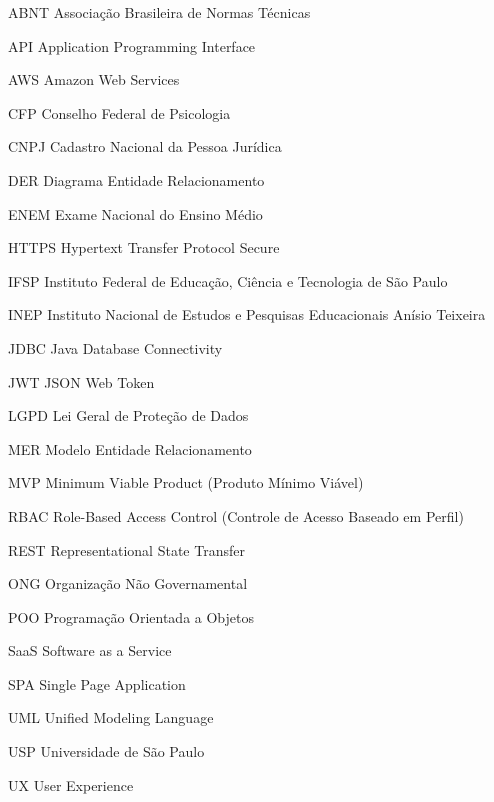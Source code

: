 \begin{siglas}
  \item[ABNT] Associação Brasileira de Normas Técnicas
  \item[API] Application Programming Interface
  \item[AWS] Amazon Web Services
  \item[CFP] Conselho Federal de Psicologia
  \item[CNPJ] Cadastro Nacional da Pessoa Jurídica
  \item[DER] Diagrama Entidade Relacionamento
  \item[ENEM] Exame Nacional do Ensino Médio
  \item[HTTPS] Hypertext Transfer Protocol Secure
  \item[IFSP] Instituto Federal de Educação, Ciência e Tecnologia de São Paulo
  \item[INEP] Instituto Nacional de Estudos e Pesquisas Educacionais Anísio Teixeira
  \item[JDBC] Java Database Connectivity
  \item[JWT] JSON Web Token
  \item[LGPD] Lei Geral de Proteção de Dados
  \item[MER] Modelo Entidade Relacionamento
  \item[MVP] Minimum Viable Product (Produto Mínimo Viável)
  \item[RBAC] Role-Based Access Control (Controle de Acesso Baseado em Perfil)
  \item[REST] Representational State Transfer
  \item[ONG] Organização Não Governamental
  \item[POO] Programação Orientada a Objetos
  \item[SaaS] Software as a Service
  \item[SPA] Single Page Application
  \item[UML] Unified Modeling Language
  \item[USP] Universidade de São Paulo
  \item[UX] User Experience
\end{siglas}